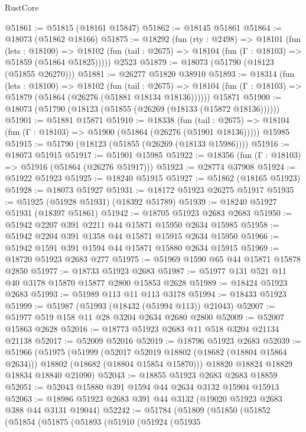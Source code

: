 \begin{lexlean}{RustCore}
\begin{coremodule}
@51861 := @51815 (@18161 @15847)
@51862 := @18145 @51861
@51864 := @18073 (@51862 @18166)
@51875 := @18292
    (fun (rty : @2498) =>
    @18101
      (fun (lets : @18100) =>
      @18102 (fun (tail : @2675) => @18104 (fun (Γ : @18103) => @51859 (@51864 @51825)))))
    @2523
@51879 := @18073 (@51790 (@18123 (@51855 @26270)))
@51881 := @26277 @51820 @38910
@51893 := @18314
    (fun (lets : @18100) =>
    @18102
      (fun (tail : @2675) =>
      @18104 (fun (Γ : @18103) => @51879 (@51864 (@26276 (@51881 @18134 @18136))))))
    @15871
@51900 := @18073 (@51790 (@18123 (@51855 (@26269 (@18133 (@15872 @18136))))))
@51901 := @51881 @15871
@51910 := @18338
    (fun (tail : @2675) => @18104 (fun (Γ : @18103) => @51900 (@51864 (@26276 (@51901 @18136)))))
    @15985
@51915 := @51790 (@18123 (@51855 (@26269 (@18133 @15986))))
@51916 := @18073 @51915
@51917 := @51901 @15985
@51922 := @18356 (fun (Γ : @18103) => @51916 (@51864 (@26276 @51917)))
@51923 := @28774 @37908
@51924 := @51922 @51923
@51925 := @18240 @51915
@51927 := @51862 (@18165 @51923)
@51928 := @18073 @51927
@51931 := @18172 @51923 @26275 @51917
@51935 := @51925 (@51928 @51931) (@18392 @51789)
@51939 := @18240 @51927 @51931 (@18397 @51861)
@51942 := @18705 @51923 @2683 @2683
@51950 := @51942 @2207 @391 @2211 @44 @15871 @15950 @2634 @15985
@51958 := @51942 @2204 @391 @1358 @44 @15871 @15915 @2634 @15950
@51966 := @51942 @1591 @391 @1594 @44 @15871 @15880 @2634 @15915
@51969 := @18720 @51923 @2683 @277
@51975 := @51969 @1590 @65 @44 @15871 @15878 @2850
@51977 := @18733 @51923 @2683
@51987 := @51977 @131 @521 @11 @40 @3178 @15870 @15877 @2800 @15853 @2628
@51989 := @18424 @51923 @2683
@51993 := @51989 @113 @11 @113 @3178
@51994 := @18433 @51923
@51999 := @51987 (@51993 (@18432 (@51994 @113)) @21043)
@52007 := @51977 @519 @158 @11 @28 @3204 @2634 @2680 @2800
@52009 := @52007 @15863 @2628
@52016 := @18773 @51923 @2683 @11 @518 @3204 @21134 @21138
@52017 := @52009 @52016
@52019 := @18796 @51923 @2683
@52039 := @51966
    (@51975
      (@51999
        (@52017 @52019 @18802 (@18682 (@18804 @15864 @2634)))
        @18802
        (@18682 (@18804 @15854 @15870)))
      @18820
      @18824
      @18829
      @18834
      @18840
      @21090)
@52043 := @18855 @51923 @2683 @2683 @18859
@52051 := @52043 @15880 @391 @1594 @44 @2634 @3132 @15904 @15913
@52063 := @18986 @51923 @2683 @391 @44 @3132 (@19020 @51923 @2683 @388 @44 @3131 @19044)
@52242 := @51784
    (@51809
      (@51850
        (@51852
          (@51854
            (@51875
              (@51893
                (@51910
                  (@51924
                    (@51935

\end{coremodule}
\end{lexlean}
